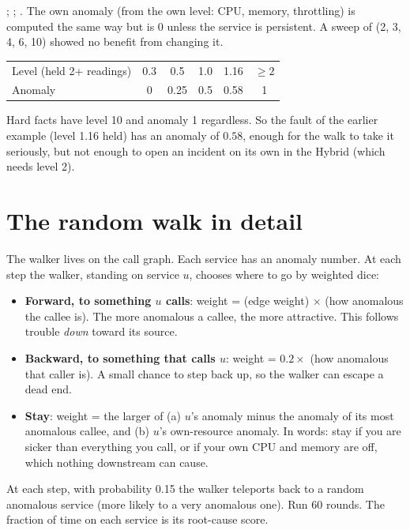 \begin{techbox}
; ; . The own anomaly (from the own level: CPU, memory, throttling) is computed the same way but is 0 unless the service is persistent. A sweep of  (2, 3, 4, 6, 10) showed no benefit from changing it.
\end{techbox}

\begin{examplebox}
\begin{center}
\small
\begin{tabular}{lccccc}
\toprule
Level (held 2+ readings) & 0.3 & 0.5 & 1.0 & 1.16 & $\ge2$\\
Anomaly & 0 & 0.25 & 0.5 & 0.58 & 1\\
\bottomrule
\end{tabular}
\end{center}
Hard facts have level 10 and anomaly 1 regardless. So the  fault of the earlier example (level 1.16 held) has an anomaly of $0.58$, enough for the walk to take it seriously, but not enough to open an incident on its own in the Hybrid (which needs level 2).
\end{examplebox}

\section{The random walk in detail}
\begin{simplebox}
The walker lives on the call graph. Each service has an anomaly number. At each step the walker, standing on service $u$, chooses where to go by weighted dice:

\begin{itemize}
\item \textbf{Forward, to something $u$ calls}: weight = (edge weight) $\times$ (how anomalous the callee is). The more anomalous a callee, the more attractive. This follows trouble \emph{down} toward its source.
\item \textbf{Backward, to something that calls $u$}: weight = $0.2\times$ (how anomalous that caller is). A small chance to step back up, so the walker can escape a dead end.
\item \textbf{Stay}: weight = the larger of (a) $u$'s anomaly minus the anomaly of its most anomalous callee, and (b) $u$'s own-resource anomaly. In words: stay if you are sicker than everything you call, or if your own CPU and memory are off, which nothing downstream can cause.
\end{itemize}

At each step, with probability 0.15 the walker teleports back to a random anomalous service (more likely to a very anomalous one). Run 60 rounds. The fraction of time on each service is its root-cause score.
\end{simplebox}

